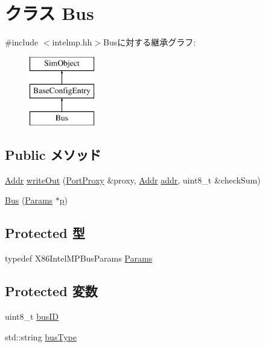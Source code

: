 \hypertarget{classX86ISA_1_1IntelMP_1_1Bus}{
\section{クラス Bus}
\label{classX86ISA_1_1IntelMP_1_1Bus}
}


{\ttfamily \#include $<$intelmp.hh$>$}Busに対する継承グラフ:\begin{figure}[H]
\begin{center}
\leavevmode
\includegraphics[height=3cm]{classX86ISA_1_1IntelMP_1_1Bus}
\end{center}
\end{figure}
\subsection*{Public メソッド}
\begin{DoxyCompactItemize}
\item 
\hyperlink{base_2types_8hh_af1bb03d6a4ee096394a6749f0a169232}{Addr} \hyperlink{classX86ISA_1_1IntelMP_1_1Bus_a5fffc1006b1f28bd779d83ffbe213b4f}{writeOut} (\hyperlink{classPortProxy}{PortProxy} \&proxy, \hyperlink{base_2types_8hh_af1bb03d6a4ee096394a6749f0a169232}{Addr} \hyperlink{namespaceX86ISA_ab705917f60c5566f9ce56a93f798b2e2}{addr}, uint8\_\-t \&checkSum)
\item 
\hyperlink{classX86ISA_1_1IntelMP_1_1Bus_a38393fe2a065382234395ece7fc042cf}{Bus} (\hyperlink{classX86ISA_1_1IntelMP_1_1Bus_a0c1ed39fdce2958466a8b166c2b32c27}{Params} $\ast$\hyperlink{namespaceX86ISA_af675c1d542a25b96e11164b80809a856}{p})
\end{DoxyCompactItemize}
\subsection*{Protected 型}
\begin{DoxyCompactItemize}
\item 
typedef X86IntelMPBusParams \hyperlink{classX86ISA_1_1IntelMP_1_1Bus_a0c1ed39fdce2958466a8b166c2b32c27}{Params}
\end{DoxyCompactItemize}
\subsection*{Protected 変数}
\begin{DoxyCompactItemize}
\item 
uint8\_\-t \hyperlink{classX86ISA_1_1IntelMP_1_1Bus_ac86b1934f811ad40b20b27d29c52a5d3}{busID}
\item 
std::string \hyperlink{classX86ISA_1_1IntelMP_1_1Bus_a84ef871bfab300fc3bfff53b4651ccc1}{busType}
\end{DoxyCompactItemize}


